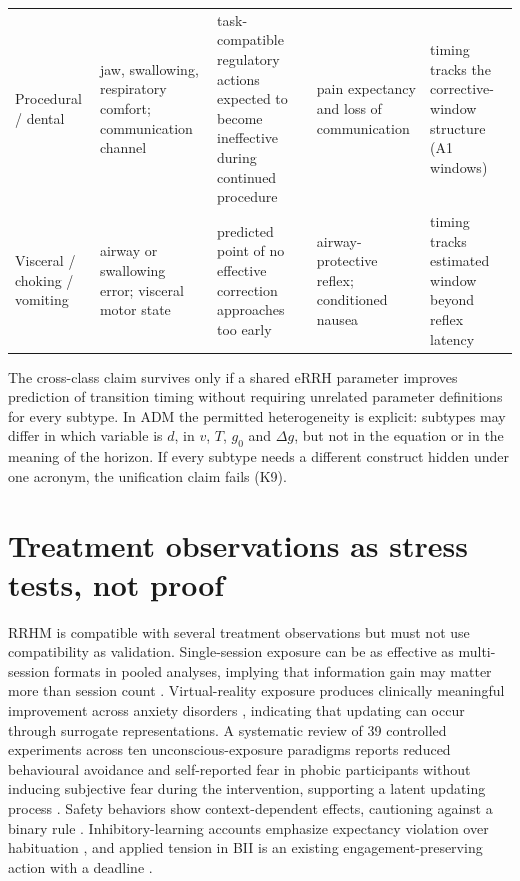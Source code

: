 \documentclass[9pt,twocolumn]{article}
\begin{document}
\begin{table}[!t]
\begin{tabularx}{\textwidth}{p{}p{}X p{}p{}}
Procedural / dental & jaw, swallowing, respiratory comfort; communication channel & task-compatible regulatory actions expected to become ineffective during continued procedure & pain expectancy and loss of communication & timing tracks the corrective-window structure (A1 windows) \\
Visceral / choking / vomiting & airway or swallowing error; visceral motor state & predicted point of no effective correction approaches too early & airway-protective reflex; conditioned nausea & timing tracks estimated window beyond reflex latency \\
\bottomrule
\end{tabularx}
\end{table}

The cross-class claim survives only if a shared eRRH parameter improves prediction of transition timing without requiring unrelated parameter definitions for every subtype. In ADM the permitted heterogeneity is explicit: subtypes may differ in which variable is $d$, in $v$, $T$, $g_0$ and $\Delta g$, but not in the equation or in the meaning of the horizon. If every subtype needs a different construct hidden under one acronym, the unification claim fails (K9).

\section{Treatment observations as stress tests, not proof}
RRHM is compatible with several treatment observations but must not use compatibility as validation. Single-session exposure can be as effective as multi-session formats in pooled analyses, implying that information gain may matter more than session count \cite{odgers2022}. Virtual-reality exposure produces clinically meaningful improvement across anxiety disorders \cite{carl2019}, indicating that updating can occur through surrogate representations. A systematic review of 39 controlled experiments across ten unconscious-exposure paradigms reports reduced behavioural avoidance and self-reported fear in phobic participants without inducing subjective fear during the intervention, supporting a latent updating process \cite{siegel2025}. Safety behaviors show context-dependent effects, cautioning against a binary rule \cite{meckes2025}. Inhibitory-learning accounts emphasize expectancy violation over habituation \cite{craske2014}, and applied tension in BII is an existing engagement-preserving action with a deadline \cite{ost1987}.
\end{document}
